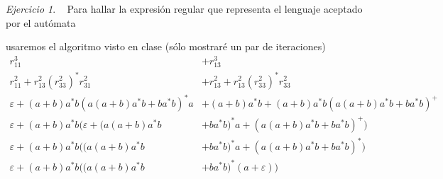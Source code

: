 \documentclass[12pt,spanish]{article}
\theoremstyle{definition}
\theoremstyle{remark}
\newtheorem{exercise}{Ejercicio}%
\begin{document}
\setcounter{exercise}{21}
\begin{exercise}~ Para hallar la expresión regular que representa el lenguaje aceptado por el autómata \vspace{-5mm}
\begin{figure}[H]
  \centering
\end{figure} \vspace{-5mm}
usaremos el algoritmo visto en clase (sólo mostraré un par de iteraciones)
\begin{align*}
  r_{11}^3&+r_{13}^3 \\
  r_{11}^2+r_{13}^2(r_{33}^2)^*r_{31}^2&+r_{13}^2+r_{13}^2(r_{33}^2)^*r_{33}^2 \\
  \varepsilon+(a+b)a^*b(a(a+b)a^*b+ba^*b)^*a&+(a+b)a^*b+(a+b)a^*b(a(a+b)a^*b+ba^*b)^+ \\
  \varepsilon+(a+b)a^*b\big(\varepsilon+(a(a+b)a^*b&+ba^*b)^*a+(a(a+b)a^*b+ba^*b)^+\big) \\
  \varepsilon+(a+b)a^*b\big((a(a+b)a^*b&+ba^*b)^*a+(a(a+b)a^*b+ba^*b)^*\big) \\
  \varepsilon+(a+b)a^*b\big((a(a+b)a^*b&+ba^*b)^*(a+\varepsilon)\big)
\end{align*}
\end{exercise}
\end{document}
